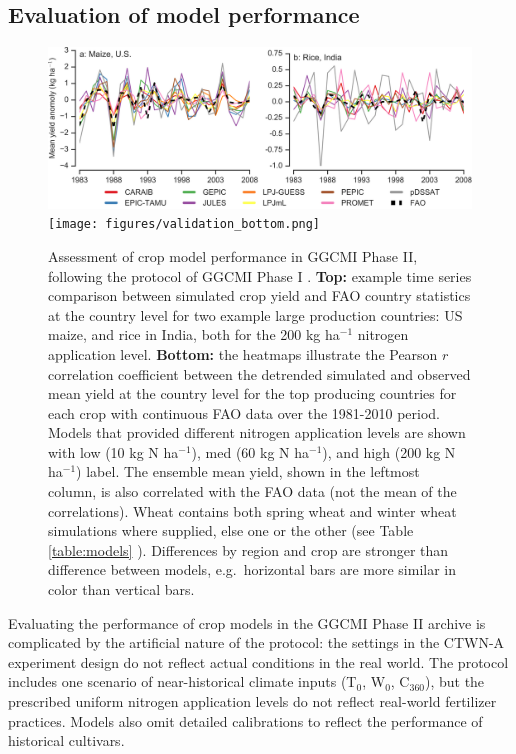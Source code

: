\documentclass[gmd, manuscript]{copernicus} %
\begin{document}
\subsection{Evaluation of model performance}
\begin{figure}[ht]
    \centering
    \includegraphics[width=14cm]{figures/validation_top.png}
    \texttt{[image: figures/validation\_bottom.png]}
    \caption{Assessment of crop model performance in GGCMI Phase II, following the protocol of GGCMI Phase I \citep{muller_global_2017}. 
    \textbf{Top:} example time series comparison between simulated crop yield and FAO country statistics \citep{FAOSTAT} at the country level for two example large production countries: US maize, and rice in India, both for the 200 kg ha$^{-1}$ nitrogen application level. 
    \textbf{Bottom:} the heatmaps illustrate the Pearson $r$ correlation coefficient between the detrended simulated and observed mean yield at the country level for the top producing countries for each crop with continuous FAO data over the 1981-2010 period. 
    Models that provided different nitrogen application levels are shown with low (10 kg N ha$^{-1}$), med (60 kg N ha$^{-1}$), and high (200 kg N ha$^{-1}$) label.
    The ensemble mean yield, shown in the leftmost column, is also correlated with the FAO data (not the mean of the correlations). 
    Wheat contains both spring wheat and winter wheat simulations where supplied, else one or the other (see Table \ref{table:models} ). 
    Differences by region and crop are stronger than difference between models, e.g.\ horizontal bars are more similar in color than vertical bars.}
    \label{fig:simulation_val}
\end{figure}

Evaluating the performance of crop models in the GGCMI Phase II archive is complicated by the artificial nature of the protocol: the settings in the CTWN-A experiment design do not reflect actual conditions in the real world. 
The protocol includes one scenario of near-historical climate inputs (T$_0$, W$_0$, C$_{360}$), but the prescribed uniform nitrogen application levels do not reflect real-world fertilizer practices. Models also omit detailed calibrations to reflect the performance of historical cultivars. 
\end{document}
